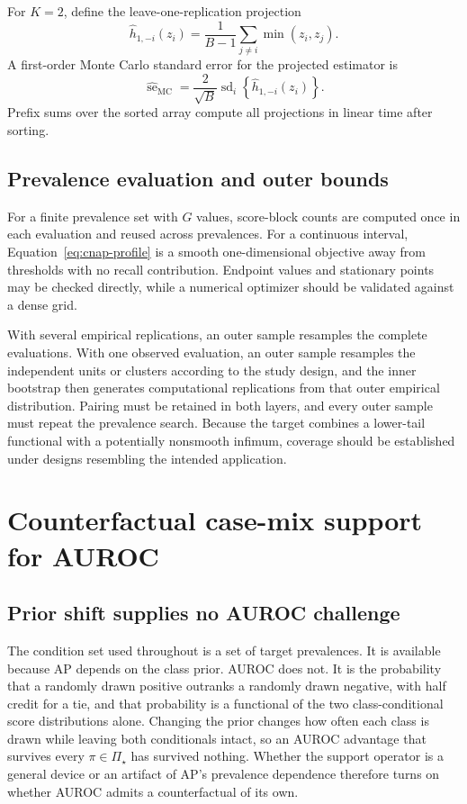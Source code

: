 \documentclass[11pt]{article}
\newcommand{\PSet}{\Pi_\star}
\theoremstyle{remark}
\begin{document}
For $K=2$, define the leave-one-replication projection
\[
\widehat h_{1,-i}(z_i)
=
\frac1{B-1}\sum_{j\ne i}\min(z_i,z_j).
\]
A first-order Monte Carlo standard error for the projected estimator is
\begin{equation}
\widehat{\operatorname{se}}_{\mathrm{MC}}
=
\frac2{\sqrt B}
\operatorname{sd}_{i}
\left\{
\widehat h_{1,-i}(z_i)
\right\}.
\label{eq:mcse}
\end{equation}
Prefix sums over the sorted array compute all projections in linear time after sorting.

\subsection{Prevalence evaluation and outer bounds}

For a finite prevalence set with $G$ values, score-block counts are computed once in each evaluation and reused across prevalences. For a continuous interval, Equation~\eqref{eq:cnap-profile} is a smooth one-dimensional objective away from thresholds with no recall contribution. Endpoint values and stationary points may be checked directly, while a numerical optimizer should be validated against a dense grid.

With several empirical replications, an outer sample resamples the complete evaluations. With one observed evaluation, an outer sample resamples the independent units or clusters according to the study design, and the inner bootstrap then generates computational replications from that outer empirical distribution. Pairing must be retained in both layers, and every outer sample must repeat the prevalence search. Because the target combines a lower-tail functional with a potentially nonsmooth infimum, coverage should be established under designs resembling the intended application.

\section{Counterfactual case-mix support for AUROC}
\label{app:auroc}

\subsection{Prior shift supplies no AUROC challenge}

The condition set used throughout is a set of target prevalences. It is
available because AP depends on the class prior. AUROC does not. It is the
probability that a randomly drawn positive outranks a randomly drawn negative,
with half credit for a tie, and that probability is a functional of the two
class-conditional score distributions alone. Changing the prior changes how
often each class is drawn while leaving both conditionals intact, so an AUROC
advantage that survives every $\pi\in\PSet$ has survived nothing. Whether the
support operator is a general device or an artifact of AP's prevalence
dependence therefore turns on whether AUROC admits a counterfactual of its own.
\end{document}
